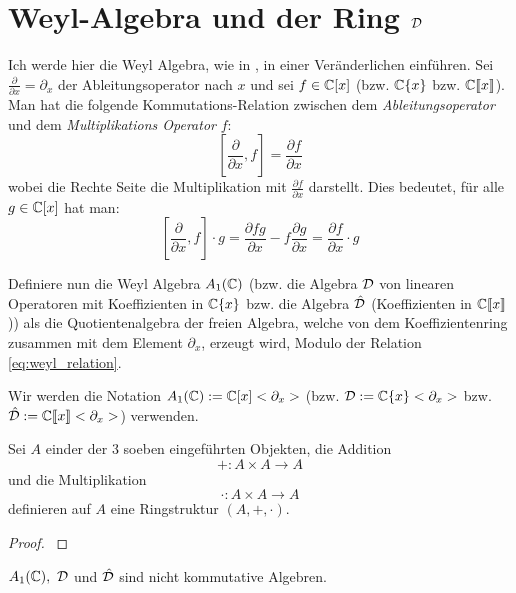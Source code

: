 \section{Weyl-Algebra und der Ring $\mathcal{D}$} %
Ich werde hier die Weyl Algebra, wie in
\cite[Chapter~1]{sabbah_cimpa90}, in einer Veränderlichen einführen.
Sei $\frac{\partial}{\partial x}=\partial_x$ der Ableitungsoperator nach $x$
und sei $f \in\mathbb{C}[x]$ (bzw. $\mathbb{C}\{x\}$ bzw. $\mathbb{C}\llbracket x\rrbracket$).
Man hat die folgende Kommutations-Relation zwischen dem
\emph{Ableitungsoperator}
und dem \emph{Multiplikations Operator} $f$:
\begin{equation}\label{eq:weyl_relation}
  [\frac{\partial}{\partial x},f]=\frac{\partial f}{\partial x}
\end{equation}
wobei die Rechte Seite die Multiplikation mit $\frac{\partial f}{\partial x}$
darstellt. Dies bedeutet, für alle $g\in\mathbb{C}[x]$ hat man:
\[
  [\frac{\partial}{\partial x},f]\cdot g
  =\frac{\partial fg}{\partial x} - f\frac{\partial g}{\partial x}
  =\frac{\partial f}{\partial x} \cdot g
\]
\begin{defn}
  Definiere nun die Weyl Algebra $A_1(\mathbb{C})$ (bzw. die Algebra $\mathcal{D}$ von
  linearen Operatoren mit Koeffizienten in $\mathbb{C}\{x\}$ bzw. die Algebra
  $\hat{\mathcal{D}}$ (Koeffizienten in $\mathbb{C}\llbracket x\rrbracket$)) als die
  Quotientenalgebra der freien Algebra, welche von dem Koeffizientenring
  zusammen mit dem Element $\partial_x$, erzeugt wird, Modulo der Relation
  \eqref{eq:weyl_relation}.
\end{defn}
Wir werden die Notation $A_1(\mathbb{C}):=\mathbb{C}[x]<\partial_x>$ (bzw.
$\mathcal{D}:=\mathbb{C}\{x\}<\partial_x>$ bzw. 
$\hat{\mathcal{D}}:=\mathbb{C}\llbracket x\rrbracket<\partial_x>$) verwenden.

\begin{lem} %
  Sei $A$ einder der 3 soeben eingeführten Objekten, die Addition 
  \[
    +:A\times A \rightarrow A
  \]
  und die Multiplikation
  \[
    \cdot:A\times A \rightarrow A
  \]
  definieren auf $A$ eine Ringstruktur $(A,+,\cdot)$.
\end{lem}
\begin{proof}
  \cite[Kapittel 2 Section 1]{ZulaBarbara}
\end{proof}

\begin{rem}
  $A_1(\mathbb{C}),~\mathcal{D}$ und $\hat{\mathcal{D}}$ sind nicht kommutative Algebren.
\end{rem}

